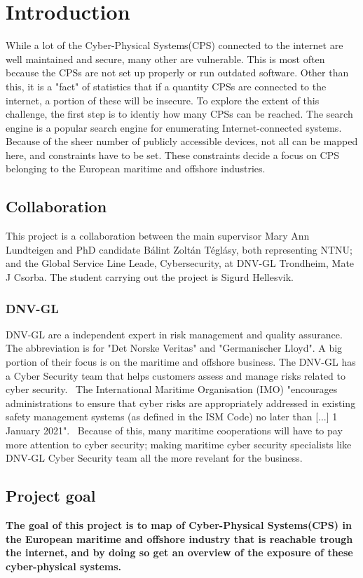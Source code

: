 
\section{Introduction} \label{sec:intro}
While a lot of the Cyber-Physical Systems(CPS) connected to the internet are well maintained and secure, many other are vulnerable. This is most often because the CPSs are not set up properly or run outdated software. Other than this, it is a "fact" of statistics that if a quantity CPSs are connected to the internet, a portion of these will be insecure. To explore the extent of this challenge, the first step is to identiy how many CPSs can be reached. The search engine \href{https://shodan.io}{\color{blue}{Shodan}} is a popular search engine for enumerating Internet-connected systems. Because of the sheer number of  publicly accessible devices, not all can be mapped here, and constraints have to be set. These constraints decide a focus on CPS belonging to the European maritime and offshore industries.

\subsection{Collaboration}\label{sec:collaboration}
This project is a collaboration between the main supervisor Mary Ann Lundteigen and PhD candidate Bálint Zoltán Téglásy, both representing NTNU; and the Global Service Line Leade, Cybersecurity, at DNV-GL Trondheim,  Mate J Csorba. The student carrying out the project is Sigurd Hellesvik.

\subsubsection{DNV-GL}\label{sec:dnvgl}
DNV-GL are a independent expert in risk management and quality assurance. The abbreviation is for "Det Norske Veritas" and "Germanischer Lloyd". A big portion of their focus is on the maritime and offshore business. The DNV-GL has a Cyber Security team that helps customers assess and manage risks related to cyber security.~\cite{DNVGL_cybersec}  The International Maritime Organisation (IMO) "encourages administrations to ensure that cyber risks are appropriately addressed in existing safety management systems (as defined in the ISM Code) no later than [...] 1 January 2021".~\cite{IMO_2021} Because of this, many maritime cooperations will have to pay more attention to cyber security; making maritime cyber security specialists like DNV-GL Cyber Security team all the more revelant for the business. 

\subsection{Project goal}\label{sec:goal}
\textbf{The goal of this project is to map of Cyber-Physical Systems(CPS) in the European maritime and offshore industry that is reachable trough the internet, and by doing so get an overview of the exposure of these cyber-physical systems.}




